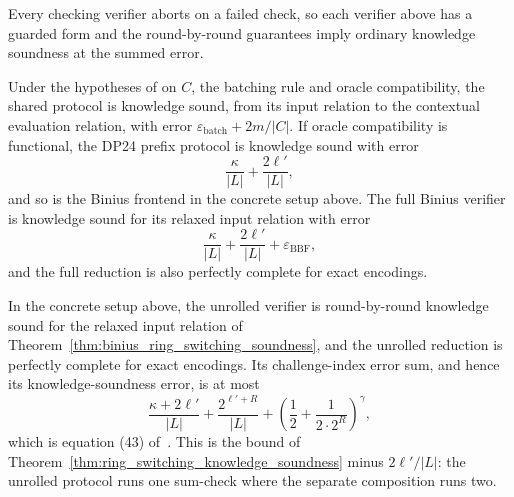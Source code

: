 Every checking verifier aborts on a failed check, so each verifier above has a guarded form and
the round-by-round guarantees imply ordinary knowledge soundness at the summed error.

\begin{theorem}
  \leanok
  \label{thm:ring_switching_knowledge_soundness}
  Under the hypotheses of  on $C$, the batching rule
  and oracle compatibility, the shared protocol is knowledge sound, from its input relation to
  the contextual evaluation relation, with error
  $\varepsilon_{\mathrm{batch}} + 2m/\lvert C\rvert$. If oracle compatibility is functional, the
  DP24 prefix protocol is knowledge sound with error
  \[
    \frac{\kappa}{\lvert L\rvert} + \frac{2\ell'}{\lvert L\rvert},
  \]
  and so is the Binius frontend in the concrete setup above. The full Binius verifier is knowledge
  sound for its relaxed input relation with error
  \[
    \frac{\kappa}{\lvert L\rvert} + \frac{2\ell'}{\lvert L\rvert}
      + \varepsilon_{\mathrm{BBF}},
  \]
  and the full reduction is also perfectly complete for exact encodings.
\end{theorem}

\begin{theorem}
  \leanok
  \label{thm:unrolled_fri_binius_security}
  In the concrete setup above, the unrolled verifier is round-by-round knowledge sound for the
  relaxed input relation of Theorem~\ref{thm:binius_ring_switching_soundness}, and the unrolled
  reduction is perfectly complete for exact encodings. Its challenge-index error sum, and hence
  its knowledge-soundness error, is at most
  \[
    \frac{\kappa + 2\ell'}{\lvert L\rvert} + \frac{2^{\ell'+R}}{\lvert L\rvert}
      + \left(\frac12 + \frac{1}{2\cdot 2^R}\right)^{\gamma},
  \]
  which is equation (43) of~\cite{DP24}. This is the bound of
  Theorem~\ref{thm:ring_switching_knowledge_soundness} minus $2\ell'/\lvert L\rvert$: the
  unrolled protocol runs one sum-check where the separate composition runs two.
\end{theorem}
